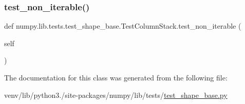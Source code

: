 \subsubsection{\texorpdfstring{test\+\_\+non\+\_\+iterable()}{test\_non\_iterable()}}
{\footnotesize\ttfamily def numpy.\+lib.\+tests.\+test\+\_\+shape\+\_\+base.\+Test\+Column\+Stack.\+test\+\_\+non\+\_\+iterable (\begin{DoxyParamCaption}\item[{}]{self }\end{DoxyParamCaption})}



The documentation for this class was generated from the following file\+:\begin{DoxyCompactItemize}
\item 
venv/lib/python3./site-\/packages/numpy/lib/tests/\hyperlink{lib_2tests_2test__shape__base_8py}{test\+\_\+shape\+\_\+base.\+py}\end{DoxyCompactItemize}
